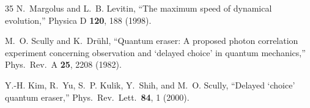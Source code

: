 \documentclass[prl,twocolumn,superscriptaddress,longbibliography]{revtex4-2}
\begin{document}
\begin{thebibliography}{35}
N.~Margolus and L.~B. Levitin,
``The maximum speed of dynamical evolution,''
Physica D \textbf{120}, 188 (1998).

M.~O. Scully and K.~Dr\"uhl,
``Quantum eraser: A proposed photon correlation experiment concerning
observation and `delayed choice' in quantum mechanics,''
Phys.\ Rev.\ A \textbf{25}, 2208 (1982).

Y.-H. Kim, R.~Yu, S.~P. Kulik, Y.~Shih, and M.~O. Scully,
``Delayed `choice' quantum eraser,''
Phys.\ Rev.\ Lett.\ \textbf{84}, 1 (2000).

\end{thebibliography}
\end{document}
